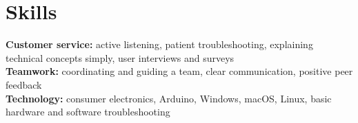 \documentclass[10pt,a4paper]{article}
\begin{document}
\section{Skills}
\textbf{Customer service:} active listening, patient troubleshooting, explaining technical concepts simply, user interviews and surveys\\
\textbf{Teamwork:} coordinating and guiding a team, clear communication, positive peer feedback\\
\textbf{Technology:} consumer electronics, Arduino, Windows, macOS, Linux, basic hardware and software troubleshooting
\end{document}

